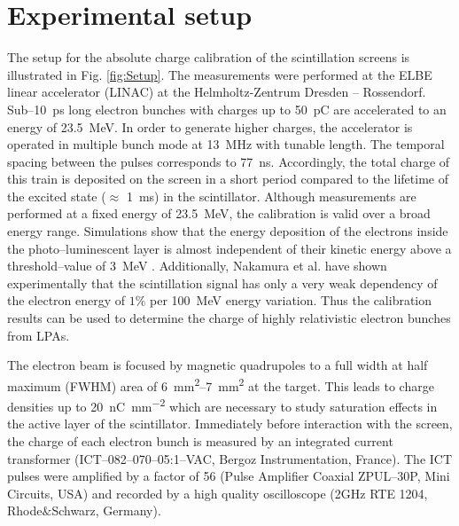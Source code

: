 \documentclass[%
preprint,
amsmath,
amssymb,
aip,
rsi, 
numerical,
floatfix,
]{revtex4-1}
\newcommand{\myCite}[1]{\textcolor{blue}{\cite{#1}}}
\begin{document}
\section{\label{Set} Experimental setup}

The setup for the absolute charge calibration of the scintillation screens is illustrated in Fig. \ref{fig:Setup}.
The measurements were performed at the ELBE linear accelerator (LINAC) at the Helmholtz-Zentrum Dresden -- Rossendorf. 
Sub--\SI{10}{\pico\second} long electron bunches with charges up to \SI{50}{\pico\coulomb} are accelerated to an energy of \SI{23.5}{\mega\electronvolt}. 
In order to generate higher charges, the accelerator is operated in multiple bunch mode at \SI{13}{\mega\hertz} with tunable length. 
The temporal spacing between the pulses corresponds to \SI{77}{\nano\second}. 
Accordingly, the total charge of this train is deposited on the screen in a short period compared to the lifetime of the excited state ($\approx$ \SI{1}{\milli\second}) in the scintillator\myCite{Morlotti1997}.
Although measurements are performed at a fixed energy of \SI{23.5}{\mega\electronvolt}, the calibration is valid over a broad energy range.
Simulations show that the energy deposition of the electrons inside the photo--luminescent layer is almost independent of their kinetic energy above a threshold--value of \SI{3}{\mega\electronvolt} \myCite{Hidding2007,Glinec2006,Masuda2008}.
Additionally, Nakamura et al.\myCite{Nakamura2011} have shown experimentally that the scintillation signal has only a very weak dependency of the electron energy of $1\%$ per \SI{100}{\mega \electronvolt} energy variation.
Thus the calibration results can be used to determine the charge of highly relativistic electron bunches from LPAs.

The electron beam is focused by magnetic quadrupoles to a full width at half maximum (FWHM) area of \SIrange{6}{7}{\milli\metre^2} at the target.
This leads to charge densities up to \SI[per-mode=symbol]{20}{\nano\coulomb \per \square\milli\meter} which are necessary to study saturation effects in the active layer of the scintillator.
Immediately before interaction with the screen, the charge of each electron bunch is measured by an integrated current transformer (ICT--082--070--05:1--VAC, Bergoz Instrumentation, France). 
The ICT pulses were amplified by a factor of 56 (Pulse Amplifier Coaxial ZPUL--30P, Mini Circuits, USA) and recorded by a high quality oscilloscope (2GHz RTE 1204, Rhode$\&$Schwarz, Germany).
\end{document}
